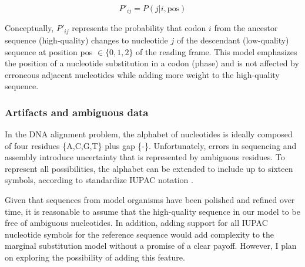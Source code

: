 \[ P'_{ij} = P(j | i, \text{pos}) \]

Conceptually, $P'_{ij}$ represents the probability that codon $i$ from the
ancestor sequence (high-quality) changes to nucleotide $j$ of the descendant
(low-quality) sequence at position pos $\in \{0,1,2\}$ of the reading frame.
This model emphasizes the position of a nucleotide substitution in a codon
(phase) and is not affected by erroneous adjacent nucleotides while adding more
weight to the high-quality sequence.


\subsubsection{Artifacts and ambiguous data}



In the DNA alignment problem, the alphabet of nucleotides is ideally composed
of four residues \{A,C,G,T\} plus gap \{-\}.
Unfortunately, errors in sequencing and assembly introduce uncertainty that is
represented by ambiguous residues.
To represent all possibilities, the alphabet can be extended to include up to
sixteen symbols, according to standardize IUPAC notation
\parencite{cornish_1985_nomenclature}.


Given that sequences from model organisms have been polished and refined over
time, it is reasonable to assume that the high-quality sequence in our model to
be free of ambiguous nucleotides.
In addition, adding support for all IUPAC nucleotide symbols for the reference
sequence would add complexity to the marginal substitution model without a
promise of a clear payoff.
However, I plan on exploring the possibility of adding this feature.

